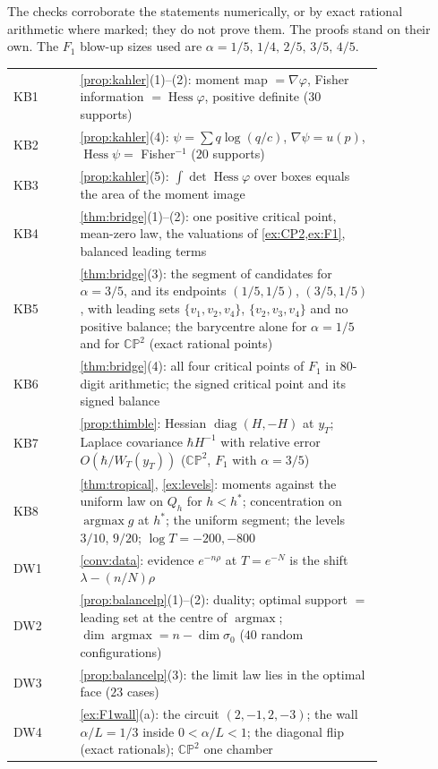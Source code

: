 \documentclass[11pt]{article}
\theoremstyle{definition}\newtheorem{definition}[theorem]{Definition}\newtheorem{remark}[theorem]{Remark}\newtheorem{example}[theorem]{Example}\newtheorem{problem}[theorem]{Open problem}\crefname{problem}{Problem}{Problems}
\begin{document}
The checks corroborate the statements numerically, or by exact rational arithmetic where marked; they do not prove them.
The proofs stand on their own. The $F_1$ blow-up sizes used are $\alpha=1/5,\,1/4,\,2/5,\,3/5,\,4/5$.
{\small
\begin{longtable}{lp{0.82\linewidth}}\toprule
KB1 & \cref{prop:kahler}(1)--(2): moment map $=\nabla\varphi$, Fisher information $=\operatorname{Hess}\varphi$, positive definite ($30$ supports)\\
KB2 & \cref{prop:kahler}(4): $\psi=\sum q\log(q/c)$, $\nabla\psi=u(p)$, $\operatorname{Hess}\psi=$ Fisher$^{-1}$ ($20$ supports)\\
KB3 & \cref{prop:kahler}(5): $\int\det\operatorname{Hess}\varphi$ over boxes equals the area of the moment image\\
KB4 & \cref{thm:bridge}(1)--(2): one positive critical point, mean-zero law, the valuations of \cref{ex:CP2,ex:F1}, balanced leading terms\\
KB5 & \cref{thm:bridge}(3): the segment of candidates for $\alpha=3/5$, and its endpoints $(1/5,1/5)$, $(3/5,1/5)$, with leading sets $\{v_1,v_2,v_4\}$, $\{v_2,v_3,v_4\}$ and no positive balance; the barycentre alone for $\alpha=1/5$ and for $\mathbb{CP}^2$ (exact rational points)\\
KB6 & \cref{thm:bridge}(4): all four critical points of $F_1$ in $80$-digit arithmetic; the signed critical point and its signed balance\\
KB7 & \cref{prop:thimble}: Hessian $\operatorname{diag}(H,-H)$ at $y_T$; Laplace covariance $\hbar H^{-1}$ with relative error $O(\hbar/W_T(y_T))$ ($\mathbb{CP}^2$, $F_1$ with $\alpha=3/5$)\\
KB8 & \cref{thm:tropical}, \cref{ex:levels}: moments against the uniform law on $Q_h$ for $h<h^*$; concentration on $\operatorname{argmax}g$ at $h^*$; the uniform segment; the levels $3/10$, $9/20$; $\log T=-200,-800$\\
DW1 & \cref{conv:data}: evidence $e^{-n\rho}$ at $T=e^{-N}$ is the shift $\lambda-(n/N)\rho$\\
DW2 & \cref{prop:balancelp}(1)--(2): duality; optimal support $=$ leading set at the centre of $\operatorname{argmax}$; $\dim\operatorname{argmax}=n-\dim\sigma_0$ ($40$ random configurations)\\
DW3 & \cref{prop:balancelp}(3): the limit law lies in the optimal face ($23$ cases)\\
DW4 & \cref{ex:F1wall}(a): the circuit $(2,-1,2,-3)$; the wall $\alpha/L=1/3$ inside $0<\alpha/L<1$; the diagonal flip (exact rationals); $\mathbb{CP}^2$ one chamber\\

\end{longtable}}
\end{document}

